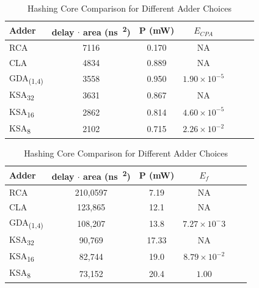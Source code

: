 \documentclass[portrait,a0,final]{a0poster}
\begin{document}
\begin{multicols}{3}
\begin{table}[H]
\centering
\caption{Adder Comparison}
\label{table:adders}
\begin{tabular}{l*{5}{c}r}
Adder & delay $\cdot$ area (\si{\nano\second \cdot {\micro\meter}^2}) & P (\si{\milli\watt}) & $E_{CPA}$ \\
\hline
RCA & 7116 & 0.170 & NA \\
CLA & 4834 & 0.889 & NA \\
\rowcolor{gray}
GDA\textsubscript{(1,4)} & 3558 & 0.950 & $1.90 \times 10^{-5}$ \\
KSA\textsubscript{32} & 3631 & 0.867 & NA \\
\rowcolor{gray}
KSA\textsubscript{16} & 2862 & 0.814 & $4.60 \times 10^{-5}$ \\
\rowcolor{gray}
KSA\textsubscript{8} & 2102 & 0.715 & $2.26 \times 10^{-2}$ \\
\end{tabular}

\centering
\caption{Hashing Core Comparison for Different Adder Choices}
\label{table:pipeline}
\begin{tabular}{l*{4}{c}r}
Adder & delay $\cdot$ area (\si{\nano\second \cdot {\micro\meter}^2}) & P (\si{\milli\watt}) & $E_f$ \\
\hline
RCA & 210,0597 & 7.19 & NA \\
CLA & 123,865 & 12.1 & NA \\
\rowcolor{gray}
GDA\textsubscript{(1,4)} & 108,207 & 13.8 & $7.27 \times 10^-3$ \\
KSA\textsubscript{32} & 90,769 & 17.33 &  NA \\
\rowcolor{gray}
KSA\textsubscript{16} & 82,744 & 19.0 & $8.79 \times 10^{-2}$ \\
\rowcolor{gray}
KSA\textsubscript{8} & 73,152 & 20.4 & $1.00$ \\
\end{tabular}
\end{table}


\end{multicols}
\end{document}
